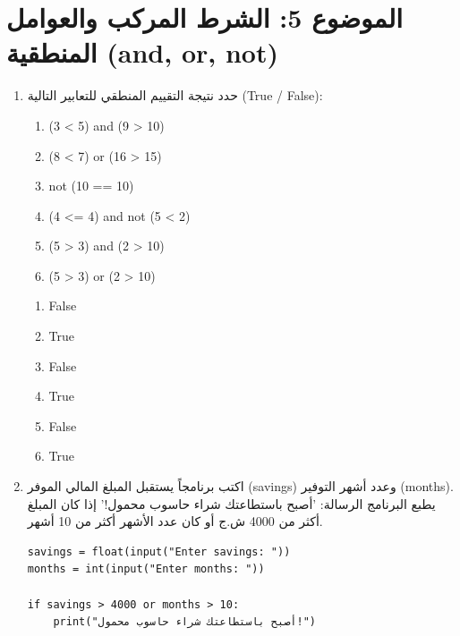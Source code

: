 \documentclass[14pt]{extarticle}
\begin{document}
\section*{الموضوع 5: الشرط المركب والعوامل المنطقية (\textenglish{and, or, not})}
\begin{enumerate}[itemsep=3em]

\item
حدد نتيجة التقييم المنطقي للتعابير التالية (\textenglish{True / False}):
\begin{enumerate}[label=\arabic*)]
    \item \textenglish{(3 < 5) and (9 > 10)}
    \item \textenglish{(8 < 7) or (16 > 15)}
    \item \textenglish{not (10 == 10)}
    \item \textenglish{(4 <= 4) and not (5 < 2)}
    \item \textenglish{(5 > 3) and (2 > 10)}
    \item \textenglish{(5 > 3) or (2 > 10)}
\end{enumerate}

\ifwithsols
\begin{boxSolution}
\begin{enumerate}[label=\arabic*)]
    \item False
    \item True
    \item False
    \item True
    \item False
    \item True
\end{enumerate}
\end{boxSolution}
\fi

\item
اكتب برنامجاً يستقبل المبلغ المالي الموفر (\textenglish{savings}) وعدد أشهر التوفير (\textenglish{months}).
يطبع البرنامج الرسالة: 'أصبح باستطاعتك شراء حاسوب محمول!' إذا كان المبلغ أكثر من 4000 ش.ج أو كان عدد الأشهر أكثر من 10 أشهر.

\ifwithsols
\begin{boxSolution}
\begin{english}
\begin{verbatim}
savings = float(input("Enter savings: "))
months = int(input("Enter months: "))

if savings > 4000 or months > 10:
    print("أصبح باستطاعتك شراء حاسوب محمول!")
\end{verbatim}
\end{english}
\end{boxSolution}
\fi


\end{enumerate}
\end{document}
